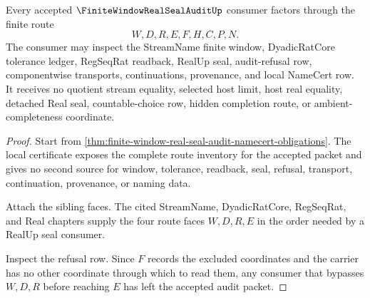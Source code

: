 \begin{theorem}
\label{thm:finite-window-real-seal-audit-nonescape}
Every accepted $\FiniteWindowRealSealAuditUp$ consumer factors through the finite route
$$
W,D,R,E,F,H,C,P,N.
$$
The consumer may inspect the StreamName finite window, DyadicRatCore tolerance ledger, RegSeqRat readback, RealUp seal, audit-refusal row, componentwise transports, continuations, provenance, and local NameCert row. It receives no quotient stream equality, selected host limit, host real equality, detached Real seal, countable-choice row, hidden completion route, or ambient-completeness coordinate.
\end{theorem}
\begin{proof}
Start from \autoref{thm:finite-window-real-seal-audit-namecert-obligations}. The local certificate exposes the complete route inventory for the accepted packet and gives no second source for window, tolerance, readback, seal, refusal, transport, continuation, provenance, or naming data.

Attach the sibling faces. The cited StreamName, DyadicRatCore, RegSeqRat, and Real chapters supply the four route faces $W,D,R,E$ in the order needed by a RealUp seal consumer.

Inspect the refusal row. Since $F$ records the excluded coordinates and the carrier has no other coordinate through which to read them, any consumer that bypasses $W,D,R$ before reaching $E$ has left the accepted audit packet.
\end{proof}

